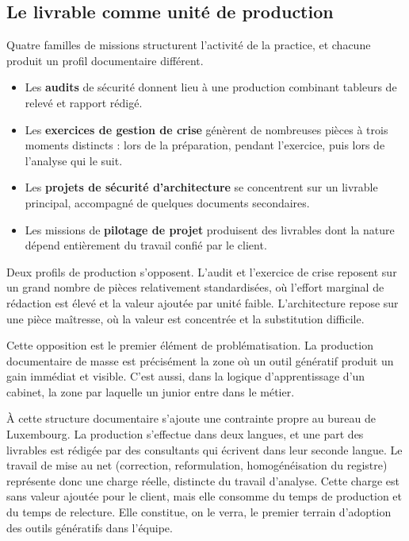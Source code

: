 \subsection{Le livrable comme unité de production}

Quatre familles de missions structurent l'activité de la practice, et chacune produit un
profil documentaire différent.

\begin{itemize}
  \item Les \textbf{audits} de sécurité donnent lieu à une production combinant tableurs de
    relevé et rapport rédigé.
  \item Les \textbf{exercices de gestion de crise} génèrent de nombreuses pièces à trois
    moments distincts : lors de la préparation, pendant l'exercice, puis lors de l'analyse
    qui le suit.
  \item Les \textbf{projets de sécurité d'architecture} se concentrent sur un livrable
    principal, accompagné de quelques documents secondaires.
  \item Les missions de \textbf{pilotage de projet} produisent des livrables dont la nature
    dépend entièrement du travail confié par le client.
\end{itemize}

Deux profils de production s'opposent.
L'audit et l'exercice de crise reposent sur un grand nombre de pièces relativement
standardisées, où l'effort marginal de rédaction est élevé et la valeur ajoutée par unité
faible. L'architecture repose sur une pièce maîtresse, où la valeur est concentrée et la
substitution difficile.

Cette opposition est le premier élément de problématisation. La production documentaire de
masse est précisément la zone où un outil génératif produit un gain immédiat et visible.
C'est aussi, dans la logique d'apprentissage d'un cabinet, la zone par laquelle un junior
entre dans le métier.

À cette structure documentaire s'ajoute une contrainte propre au bureau de Luxembourg. La
production s'effectue dans deux langues, et une part des livrables est rédigée par des
consultants qui écrivent dans leur seconde langue. Le travail de mise au net (correction,
reformulation, homogénéisation du registre) représente donc une charge réelle, distincte
du travail d'analyse. Cette charge est sans valeur ajoutée pour le client, mais elle
consomme du temps de production et du temps de relecture. Elle constitue, on le verra, le
premier terrain d'adoption des outils génératifs dans l'équipe.

